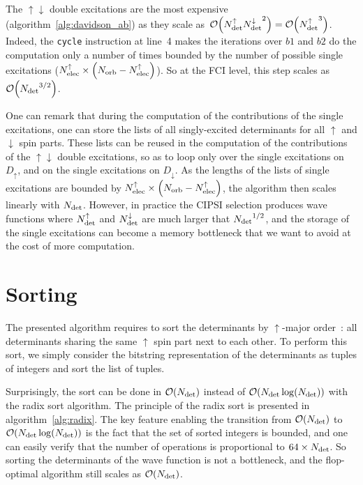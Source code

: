 \documentclass[./thesis.tex]{subfiles}
\begin{document}
The $\uparrow\downarrow$ double excitations are the most expensive (algorithm~\ref{alg:davidson_ab})
as they scale as~$\order{\Nalphadet \Nbetadet^2} = \order{\Nalphadet^3}$. Indeed, the \texttt{cycle} instruction at line~4 makes the
iterations over $b1$ and $b2$ do the computation only a number of times bounded by the number of 
possible single excitations (${N_\text{elec}^{\uparrow}} \times \qty({N_\text{orb}} - {N_\text{elec}^{\uparrow}})$). So at the FCI level, this step scales as
$\order{\Ndet^{3/2}}$.

One can remark that during the computation of the contributions of the single
excitations, one can store the lists of all singly-excited determinants
for all $\uparrow$ and $\downarrow$ spin parts.
These lists can be reused in the computation of the contributions of the $\uparrow\downarrow$
double excitations, so as to loop only over the single excitations on
$D_\uparrow$, and on the single excitations on $D_\downarrow$. As the lengths of the
lists of single excitations are bounded by ${N_\text{elec}^{\uparrow}} \times \qty({N_\text{orb}} - {N_\text{elec}^{\uparrow}})$, the
algorithm then scales linearly with ${N_\text{det}}$.  However, in practice the CIPSI
selection produces wave functions where ${N_\text{det}^{\uparrow}}$ and ${N_\text{det}^{\downarrow}}$ are much larger
that ${N_\text{det}}^{1/2}$, and the storage of the single excitations can become a
memory bottleneck that we want to avoid at the cost of more computation.

\section{Sorting}

The presented algorithm requires to sort the determinants by $\uparrow$-major order~: all determinants
sharing the same $\uparrow$ spin part next to each other. To perform this sort, we simply consider the
bitstring representation of the determinants as tuples of integers and sort the list of tuples.

Surprisingly, the sort can be done in $\order{\Ndet}$ instead of $\order{\Ndet \log(\Ndet)}$ with the
radix sort algorithm.\cite{Davis1992Dec}
The principle of the radix sort is presented in algorithm~\ref{alg:radix}.  The
key feature enabling the transition from $\order{\Ndet}$ to $\order{\Ndet
\log(\Ndet)}$ is the fact that the set of sorted integers is bounded, and one
can easily verify that the number of operations is proportional to $64\times
{N_\text{det}}$. So sorting the determinants of the wave function is not a bottleneck,
and the flop-optimal algorithm still scales as $\order{\Ndet}$.
\end{document}
